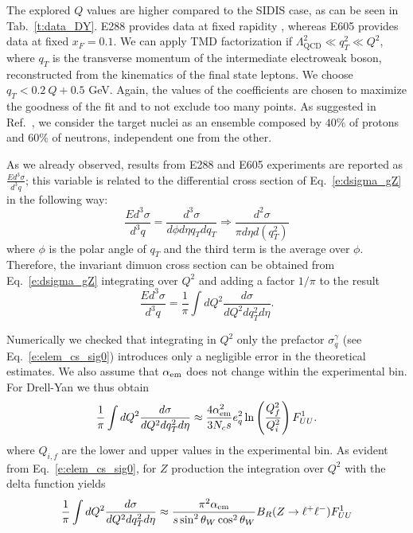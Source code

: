 \documentclass[aps,preprintnumbers,showpacs,nofootinbib,superscriptaddress,floatfix]{revtex4}
\begin{document}
The explored $Q$ values are higher compared to the SIDIS case, as can be seen
in Tab.~\ref{t:data_DY}. E288 provides data at fixed rapidity
,
whereas E605 provides data at fixed $x_F=0.1$.  
We can apply TMD factorization if
$\Lambda_{\text{QCD}}^2 \ll q_T^2 \ll Q^2$, where $q_T$ is the transverse
momentum of the intermediate electroweak boson, reconstructed from the
kinematics of the final state leptons. We choose $q_T <
0.2\ Q + 0.5$ GeV. Again, the values of the coefficients are chosen to
maximize the goodness of the fit and to not exclude too many points. 
As suggested in Ref.~\cite{Ito:1980ev}, we consider the target nuclei as an
ensemble composed by $40\%$ of protons and $60\%$ of neutrons, 
independent one from the other.

As we already observed, results from E288 and E605 experiments are reported as
$\frac{Ed^3\sigma}{d^3q}$; this variable is related to the differential cross
section of Eq.~\eqref{e:dsigma_gZ} in the following way:
\begin{equation}
\frac{Ed^3\sigma}{d^3q}=\frac{d^3\sigma}{d\phi d\eta q_T dq_T} \Rightarrow \frac{d^2\sigma}{\pi d\eta d(q^2_T)}
\end{equation}
where $\phi$ is the polar angle of $q_T$ and 
the third term is the average over $\phi$.
Therefore, the invariant dimuon cross section can be obtained from Eq.~\eqref{e:dsigma_gZ} integrating over $Q^2$ and adding a factor $1/\pi$ to the result
\begin{equation}
\frac{Ed^3\sigma}{d^3q} = \frac{1}{\pi} \int dQ^2 \frac{d\sigma}{dQ^2dq^2_T d\eta} .
\end{equation}

Numerically we checked that integrating in $Q^2$ only the prefactor
$\sigma_q^\gamma$ (see Eq.~\eqref{e:elem_cs_sig0}) introduces only
a negligible error in the theoretical estimates. We also assume that
$\alpha_{\rm em}$ does not change within the experimental bin. For Drell-Yan we
thus obtain
\begin{equation}
\frac{1}{\pi} \int dQ^2 \frac{d\sigma}{dQ^2dq^2_T d\eta}
\approx 
\frac{4\alpha_{\rm em}^2}{3 N_c s} e_q^2 \ln \left( \frac{Q_f^2}{Q_i^2} \right)
F_{UU}^1. 
\end{equation}
where $Q_{i,f}$ are the lower and upper values in the experimental bin. 
As evident from Eq.~\eqref{e:elem_cs_sig0},  
for $Z$ production the integration over $Q^2$ with the delta function yields
\begin{equation}
\frac{1}{\pi} \int dQ^2 \frac{d\sigma}{dQ^2dq^2_T d\eta}
\approx 
\frac{\pi^2 \alpha_{\rm em}}{s \sin^2{\theta_W} \cos^2{\theta_W}}
B_R(Z\rightarrow \ell^+\ell^-) F_{UU}^1
\end{equation} 
\end{document}
